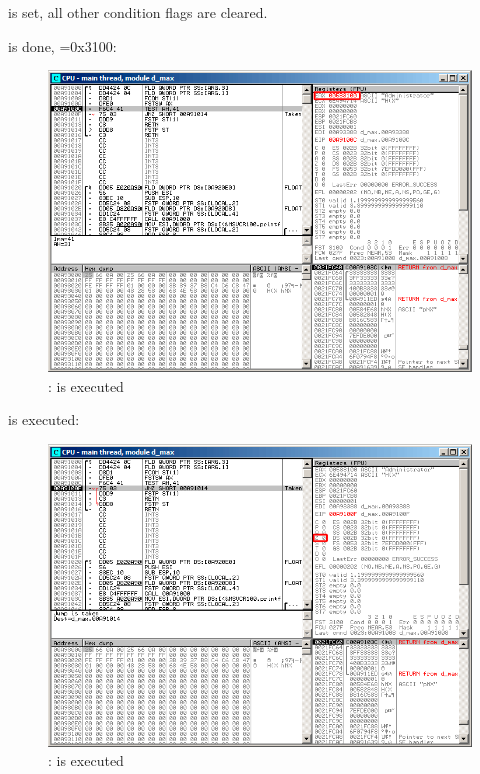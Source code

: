\Czero is set, all other condition flags are cleared.

\clearpage
\FNSTSW is done, =0x3100:

\begin{figure}[H]
\centering
\includegraphics[scale=\FigScale]{patterns/12_FPU/3_comparison/x86/MSVC_Ox/olly1_3.png}
\caption{\olly: \FNSTSW is executed}
\label{fig:FPU_comparison_Ox_case1_olly3}
\end{figure}

\clearpage
\TEST is executed:

\begin{figure}[H]
\centering
\includegraphics[scale=\FigScale]{patterns/12_FPU/3_comparison/x86/MSVC_Ox/olly1_4.png}
\caption{\olly: \TEST is executed}
\label{fig:FPU_comparison_Ox_case1_olly4}
\end{figure}

